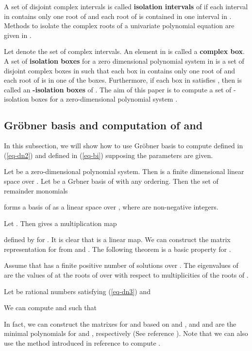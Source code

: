 \documentclass[amsthm]{JSC_LaTex_2007_Mar_12/elsart}
\def\bref#1{(\ref{#1})}
\begin{document}
A set  of disjoint complex intervals  is called {\bf
isolation intervals} of  if each interval in 
contains only one root of  and each root of  is
contained in one interval in .
Methods to isolate the complex roots of a univariate polynomial
equation are given in \cite{collins-c1,pinkert,sy,wilf}.

Let  denote the set of complex intervals. An element
 in  is called a {\bf
complex box}.
A set  of {\bf isolation boxes} for a zero dimensional
polynomial system  in  is a set of
disjoint complex boxes in   such that each box in
 contains only one root of  and each
root of  is in one of the boxes.
Furthermore,  if each box  
in  satisfies , then  is called an {\bf
-isolation boxes} of .
The aim of this paper is to compute a set of -isolation
boxes for a zero-dimensional polynomial system .

\subsection{Gr\"obner basis and computation of  and }
In this subsection, we will show how to use Gr\"obner basis to
compute  defined in \bref{eq-dn2} and  defined in
\bref{eq-bi} supposing the parameters  are given.

Let  be a zero-dimensional polynomial
system. Then   is a
finite dimensional linear space over . Let  be a
Grbner basis of  with any ordering. Then the set of
remainder monomials

forms a basis of  as a linear space over , where
 are non-negative integers.

Let . Then  gives a multiplication map

defined by  for .
It is clear that  is a linear map. We can construct the matrix
representation for  from   and . The following theorem
is a basic property for  \cite{lazard1}.

\begin{thm}\label{thm-laz}
Assume that  has a finite positive
number of solutions over . The eigenvalues of  are the
values of  at the roots of  over  with respect to
multiplicities of the roots of .
\end{thm}


Let  be rational numbers satisfying \bref{eq-dn3} and


We can compute  and  such that

In fact, we can construct the matrixes for  and  based
on  and , and  and  are the minimal
polynomials for  and , respectively  (See reference
\cite{cox}).
Note that we can also use the method introduced in reference
\cite{fglm} to compute .
\end{document}
